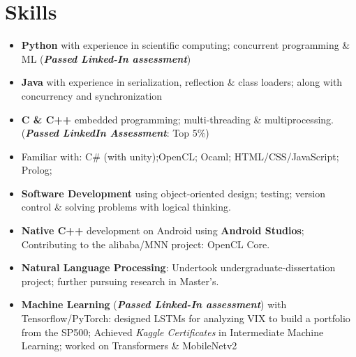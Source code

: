 \documentclass[11pt]{article}
\begin{document}

\section{ Skills}

\begin{itemize}
    \item \textbf{Python} with experience in scientific computing; concurrent programming \& ML (\textbf{\textit{Passed Linked-In assessment}}) 
    \item \textbf{Java} with experience in serialization, reflection \& class loaders; along with concurrency and synchronization
    \item \textbf{C \& C++} embedded programming; multi-threading \& multiprocessing. (\textbf{\textit{Passed LinkedIn Assessment}}: Top 5\%)
    \item Familiar with: C\# (with unity);{OpenCL}; Ocaml; HTML/CSS/JavaScript; Prolog; 
\end{itemize}
\hline
\begin{itemize}
    \item \textbf{Software Development} using object-oriented design; testing; version control \& solving problems with logical thinking.
    \item \textbf{Native C++} development on Android using \textbf{Android Studios}; Contributing to the alibaba/MNN project: OpenCL Core.
    \item \textbf{Natural Language Processing}: Undertook undergraduate-dissertation project; further pursuing research in Master's.
    \item \textbf{Machine Learning} (\textbf{\textit{Passed Linked-In assessment}}) with Tensorflow/PyTorch: designed LSTMs for analyzing VIX to build a portfolio from the SP500; Achieved {\textit{Kaggle Certificates}} in Intermediate Machine Learning; worked on Transformers \& MobileNetv2
    
\end{itemize}

\end{document}
